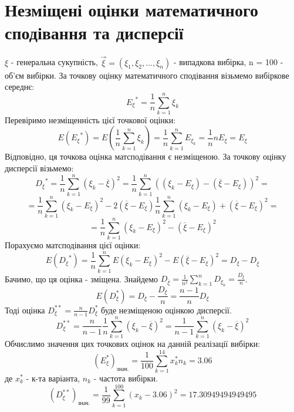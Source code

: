 \documentclass{article}
\begin{document}
\section{Незміщені оцінки математичного сподівання та дисперсії}
$\xi$ - генеральна сукупність, $\vec{\xi} = 
(\xi_1, \xi_2, \dots, \xi_{n})$ - випадкова вибірка, 
n = 100 - об’єм вибірки.  
\newline
За точкову оцінку математичного сподівання візьмемо вибіркове середнє:
$${E_\xi}^* = \frac{1}{n} \sum_{k=1}^{n}\xi_k$$
Перевіримо незміщенність цієї точкової оцінки:
\begin{equation}\label{bias}
  E({E_\xi}^*) = E(\frac{1}{n} \sum_{k=1}^{n}\xi_k) = 
  \frac{1}{n} \sum_{k=1}^{n}E_{\xi_k} = \frac{1}{n}nE_{\xi} 
  = E_\xi
\end{equation}
Відповідно, ця точкова оцінка матсподівання є незміщеною.
\newline
За точкову оцінку дисперсії візьмемо:
$$ {D_{\xi}}^{*} = \frac{1}{n} \sum_{k=1}^n 
(\xi_k - \overline{\xi})^2 = \frac{1}{n}\sum_{k=1}^n
((\xi_k - E_\xi) - (\overline{\xi} - E_\xi))^2 = $$
$$= \frac{1}{n} \sum_{k = 1}^n(\xi_k - E_\xi)^2 - 2(\overline{\xi} 
- E_\xi)\frac{1}{n}\sum_{k=1}^n(\xi_k - E_\xi) + (\overline{\xi} 
- E_\xi)^2 = $$
$$= \frac{1}{n} \sum_{k = 1}^n (\xi_k - E_\xi)^2 - (\overline{\xi} 
- E_\xi)^2$$
Порахуємо матсподівання цієї оцінки:
$$E({D_{\xi}}^{*}) = \frac{1}{n}\sum_{k=1}^n E(\xi_k - E_\xi)^2 
- E(\overline{\xi} - E_\xi)^2 = D_\xi - D_{\overline{\xi}}$$
Бачимо, що ця оцінка - зміщена.
Знайдемо $D_{\overline{\xi}} = \frac{1}{n^2}\sum_{k=1}^n D_{\xi_k} = 
\frac{D_{\xi}}{n}$.
$$E(D_\xi^*) = D_\xi - \frac{D_\xi}{n} = \frac{n-1}{n}D_\xi$$
Тоді оцінка $D^{**}_\xi = \frac{n}{n-1}D_\xi^*$ буде незміщеною 
оцінкою дисперсії.
$$D^{**}_\xi = \frac{n}{n-1} \frac{1}{n} \sum_{k=1}^n 
(\xi_k - \overline{\xi})^2 = \frac{1}{n - 1} \sum_{k=1}^n 
(\xi_k - \overline{\xi})^2$$
Обчислимо значення цих точкових оцінок на данній реалізації вибірки:
$$(E^*_{\xi})_{\text{знач.}} = \frac{1}{100} 
\sum_{k = 1}^{14} x_k^* n_k = 3.06$$
де $x_k^*$ - к-та варіанта, $n_k$ - частота вибірки.
$$(D^{**}_\xi)_\text{знач.} = \frac{1}{99} \sum_{k = 1}^{100}
(x_k - 3.06)^2 = 17.30949494949495$$
\newpage
\end{document}
